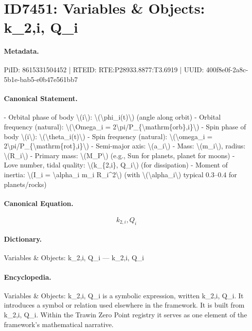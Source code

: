 \section*{ID7451: Variables \& Objects: k\_2,i, Q\_i}
\paragraph{Metadata.}
PiID: 8615331504452 | RTEID: RTE:P28933.8877:T3.6919 | UUID: 400f8e0f-2a8c-5b1e-bab5-e0b47e561bb7

\paragraph{Canonical Statement.}
- Orbital phase of body \textbackslash{}(i\textbackslash{}): \textbackslash{}(\textbackslash{}phi\_i(t)\textbackslash{}) (angle along orbit) - Orbital frequency (natural): \textbackslash{}(\textbackslash{}Omega\_i = 2\textbackslash{}pi/P\_\{\textbackslash{}mathrm\{orb\},i\}\textbackslash{}) - Spin phase of body \textbackslash{}(i\textbackslash{}): \textbackslash{}(\textbackslash{}theta\_i(t)\textbackslash{}) - Spin frequency (natural): \textbackslash{}(\textbackslash{}omega\_i = 2\textbackslash{}pi/P\_\{\textbackslash{}mathrm\{rot\},i\}\textbackslash{}) - Semi-major axis: \textbackslash{}(a\_i\textbackslash{}) - Mass: \textbackslash{}(m\_i\textbackslash{}), radius: \textbackslash{}(R\_i\textbackslash{}) - Primary mass: \textbackslash{}(M\_P\textbackslash{}) (e.g., Sun for planets, planet for moons) - Love number, tidal quality: \textbackslash{}(k\_\{2,i\}, Q\_i\textbackslash{}) (for dissipation) - Moment of inertia: \textbackslash{}(I\_i = \textbackslash{}alpha\_i m\_i R\_i\textasciicircum{}2\textbackslash{}) (with \textbackslash{}(\textbackslash{}alpha\_i\textbackslash{}) typical 0.3–0.4 for planets/rocks)

\paragraph{Canonical Equation.}
\[
k_{2,i}, Q_i
\]

\paragraph{Dictionary.}
Variables \& Objects: k\_2,i, Q\_i — k\_2,i, Q\_i

\paragraph{Encyclopedia.}
Variables \& Objects: k\_2,i, Q\_i is a symbolic expression, written k\_2,i, Q\_i. It introduces a symbol or relation used elsewhere in the framework. It is built from k\_2,i, Q\_i. Within the Trawin Zero Point registry it serves as one element of the framework's mathematical narrative.
